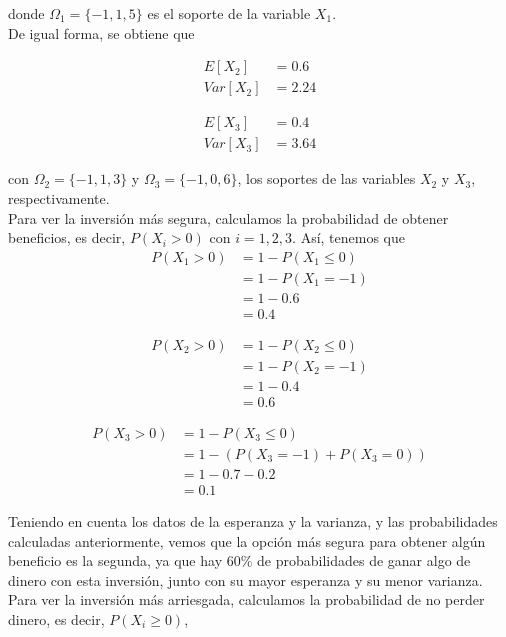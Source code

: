 \documentclass[12pt,a4paper,twoside,openright,titlepage,final]{article}
\begin{document}
donde $\Omega_1 = \{-1, 1, 5\}$ es el soporte de la variable $X_1$.\\

De igual forma, se obtiene que 

\begin{align*}
E[X_2] & = 0.6 \\
Var[X_2] & = 2.24
\end{align*}

\begin{align*}
E[X_3] & = 0.4 \\
Var[X_3] & = 3.64
\end{align*}

con $\Omega_2 = \{-1, 1, 3\}$ y $\Omega_3 = \{-1, 0, 6\}$, los soportes de las variables $X_2$ y $X_3$, respectivamente.\\

Para ver la inversión más segura, calculamos la probabilidad de obtener beneficios, es decir, $P(X_i > 0)$ con $i = 1,2,3$. Así, tenemos que\\

\begin{align*}
P(X_1 > 0) & = 1 - P(X_1 \leq 0) \\ & = 1 - P(X_1 = -1) \\ & = 1 - 0.6 \\ & = 0.4
\end{align*}

\begin{align*}
P(X_2 > 0) & = 1 - P(X_2 \leq 0) \\ & = 1 - P(X_2 = -1) \\ & = 1 - 0.4 \\ & = 0.6
\end{align*}

\begin{align*}
P(X_3 > 0) & = 1 - P(X_3 \leq 0) \\ & = 1 - (P(X_3 = -1) + P(X_3 = 0)) \\ & = 1 - 0.7 - 0.2 \\ & = 0.1
\end{align*}

Teniendo en cuenta los datos de la esperanza y la varianza, y las probabilidades calculadas anteriormente, vemos que la opción más segura para obtener algún beneficio es la segunda, ya que hay 60\% de probabilidades de ganar algo de dinero con esta inversión, junto con su mayor esperanza y su menor varianza. \\

Para ver la inversión más arriesgada, calculamos la probabilidad de no perder dinero, es decir, $P(X_i \geq 0)$,
\end{document}
